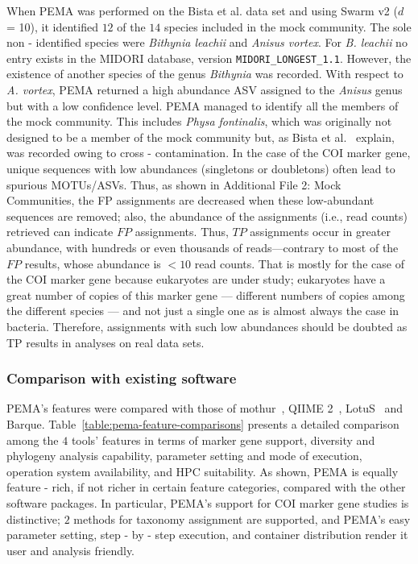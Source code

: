       When PEMA was performed on the Bista et al. data set \citep{bista2018performance} and using Swarm v2 ($d$ = 10), it identified $12$ of the $14$ species included in the mock community. 
      The sole non - identified species were \textit{Bithynia leachii} and \textit{Anisus vortex}. For \textit{B. leachii} no entry exists in the MIDORI database, version \texttt{MIDORI\_LONGEST\_1.1}. 
      However, the existence of another species of the genus \textit{Bithynia} was recorded. 
      With respect to \textit{A. vortex}, PEMA returned a high abundance ASV assigned to the \textit{Anisus} genus but with a low confidence level. 
      PEMA managed to identify all the members of the mock community. 
      This includes \textit{Physa fontinalis}, which was originally not designed to be a member of the mock community but, as Bista et al.~\citep{bista2018performance} explain, was recorded owing to cross - contamination. 
      In the case of the COI marker gene, unique sequences with low abundances (singletons or doubletons) often lead to spurious MOTUs/ASVs. 
      Thus, as shown in Additional File 2: Mock Communities, the FP assignments are decreased when these low-abundant sequences are removed; 
      also, the abundance of the assignments (i.e., read counts) retrieved can indicate $FP$ assignments. 
      Thus, $TP$ assignments occur in greater abundance, with hundreds or even thousands of reads—contrary to most of the $FP$ results, whose abundance is $<10$ read counts. 
      That is mostly for the case of the COI marker gene because eukaryotes are under study; 
      eukaryotes have a great number of copies of this marker gene — different numbers of copies among the different species — and not just a single one as is almost always the case in bacteria. 
      Therefore, assignments with such low abundances should be doubted as TP results in analyses on real data sets.



   \subsubsection*{Comparison with existing software}

      PEMA's features were compared with those of mothur~\citep{schloss2009introducing}, QIIME 2~\citep{bolyen2018qiime}, LotuS~\citep{hildebrand2014lotus} and Barque. 
      Table~\ref{table:pema-feature-comparisons} presents a detailed comparison among the $4$ tools' features in terms of marker gene support, diversity and phylogeny analysis capability, parameter setting and mode of execution, operation system availability, and HPC suitability. 
      As shown, PEMA is equally feature - rich, if not richer in certain feature categories, compared with the other software packages. In particular, PEMA's support for COI marker gene studies is distinctive; 
      $2$ methods for taxonomy assignment are supported, and PEMA's easy parameter setting, step - by - step execution, and container distribution render it user and analysis friendly.

